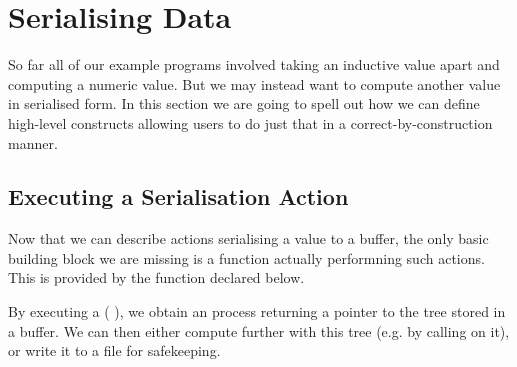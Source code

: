 \section{Serialising Data}\label{sec:serialising}

So far all of our example programs involved taking an inductive value
apart and computing a numeric value.
%
But we may instead want to compute another value in serialised form.
%
In this section we are going to spell out how we can define high-level
constructs allowing users to do just that in a correct-by-construction
manner.






\subsection{Executing a Serialisation Action}

Now that we can describe actions serialising a value to a buffer,
the only basic building block we are missing is a function actually
performning such actions.
%
This is provided by the  function
declared below.


By executing a (  ), we
obtain an  process returning a pointer to the tree 
stored in a buffer.
%
We can then either compute further with this tree (e.g. by calling
 on it), or write it to a file for safekeeping.
